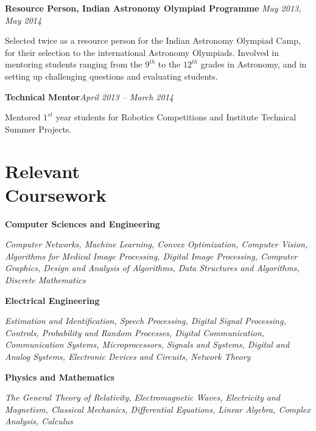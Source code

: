 \documentclass[margin,line]{res}
\newenvironment{list1}{
  \begin{list}{\ding{113}}{%
      \setlength{\itemsep}{0in}
      \setlength{\parsep}{0in} \setlength{\parskip}{0in}
      \setlength{\topsep}{0in} \setlength{\partopsep}{0in} 
      \setlength{\leftmargin}{0.17in}}}{\end{list}}
\begin{document}
\begin{resume}
\vspace*{-0.1in}

\textbf{Resource Person, Indian Astronomy Olympiad Programme} \hfill \textit{May 2013, May 2014} \\
\vspace*{-.15in}
\begin{list1}
\item[] Selected twice as a resource person for the Indian Astronomy Olympiad Camp, for their selection to the international Astronomy Olympiads. Involved in mentoring students ranging from the $9^{th}$ to the $12^{th}$ grades in Astronomy, and in setting up challenging questions and evaluating students.
\end{list1}

\vspace*{-0.1in}

\textbf{Technical Mentor}\hfill \textit{April 2013 -- March 2014} \\
\vspace*{-.15in}
\begin{list1}
\item[] Mentored $1^{st}$ year students for Robotics Competitions and Institute Technical Summer Projects.
\end{list1}

\section{\sc Relevant \\Coursework} 
\begin{list1}
\item[\strut\hspace{0.5cm}\hypertarget{crselst}{\textbf{Computer Sciences and Engineering}}]
\item[]\textit{Computer Networks, Machine Learning, Convex Optimization, Computer Vision, Algorithms for Medical Image Processing, Digital Image Processing, Computer Graphics, Design and Analysis of Algorithms, Data Structures and Algorithms, Discrete Mathematics}
\item[\strut\hspace{0.5cm}\textbf{Electrical Engineering}]
\vspace{0.05in}
\item[]\textit{Estimation and Identification, Speech Processing, Digital Signal Processing, Controls, Probability and Random Processes, Digital Communication, Communication Systems, Microprocessors, Signals and Systems, Digital and Analog Systems, Electronic Devices and Circuits, Network Theory}
\item[\strut\hspace{0.5cm}\textbf{Physics and Mathematics}]
\vspace{0.05in}
\item[]\textit{The General Theory of Relativity, Electromagnetic Waves, Electricity and Magnetism, Classical Mechanics, Differential Equations, Linear Algebra, Complex Analysis, Calculus}
\end{list1}


\end{resume}
\end{document}
